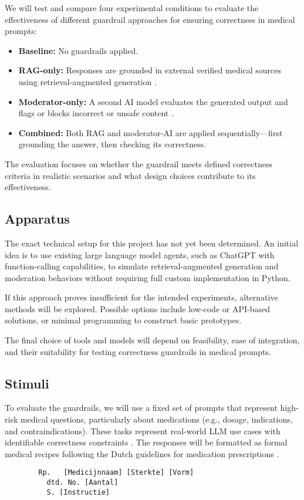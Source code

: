 \documentclass[a4paper,doc,natbib]{apa6}
\begin{document}
    We will test and compare four experimental conditions to evaluate the effectiveness of different guardrail approaches for ensuring correctness in medical prompts:

    \begin{itemize}
        \item \textbf{Baseline:} No guardrails applied.
        \item \textbf{RAG-only:} Responses are grounded in external verified medical sources using retrieval-augmented generation \citep{dong2024guardrails}.
        \item \textbf{Moderator-only:} A second AI model evaluates the generated output and flags or blocks incorrect or unsafe content \citep{inan2023llamaguard}.
        \item \textbf{Combined:} Both RAG and moderator-AI are applied sequentially—first grounding the answer, then checking its correctness.
    \end{itemize}

    The evaluation focuses on whether the guardrail meets defined correctness criteria in realistic scenarios and what design choices contribute to its effectiveness.

    \subsection{Apparatus}

    The exact technical setup for this project has not yet been determined. An initial idea is to use existing large language model agents, such as ChatGPT with function-calling capabilities, to simulate retrieval-augmented generation and moderation behaviors without requiring full custom implementation in Python.

    If this approach proves insufficient for the intended experiments, alternative methods will be explored. Possible options include low-code or API-based solutions, or minimal programming to construct basic prototypes.

    The final choice of tools and models will depend on feasibility, ease of integration, and their suitability for testing correctness guardrails in medical prompts.

    \subsection{Stimuli}

    To evaluate the guardrails, we will use a fixed set of prompts that represent high-risk medical questions, particularly about medications (e.g., dosage, indications, and contraindications).
    These tasks represent real-world LLM use cases with identifiable correctness constraints \citep{pais2024medication}.
    The responses will be formatted as formal medical recipes following the Dutch guidelines for medication prescriptions \citep{farmacotherapeutischkompas}.
    \begin{verbatim}
        Rp.   [Medicijnnaam] [Sterkte] [Vorm]
          dtd. No. [Aantal]
          S. [Instructie]
    \end{verbatim}
\end{document}
